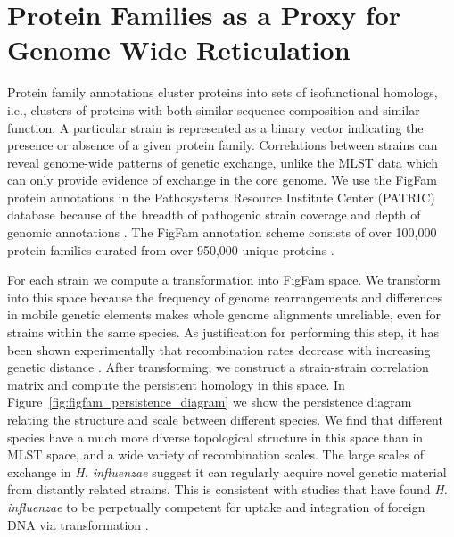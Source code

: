 \section{Protein Families as a Proxy for Genome Wide Reticulation}
\label{pathogens:patric_analysis}

Protein family annotations cluster proteins into sets of isofunctional homologs, i.e., clusters of proteins with both similar sequence composition and similar function.
A particular strain is represented as a binary vector indicating the presence or absence of a given protein family.
Correlations between strains can reveal genome-wide patterns of genetic exchange, unlike the MLST data which can only provide evidence of exchange in the core genome.
We use the FigFam protein annotations in the Pathosystems Resource Institute Center (PATRIC) database because of the breadth of pathogenic strain coverage and depth of genomic annotations \cite{Wattam:2013jy}.
The FigFam annotation scheme consists of over 100,000 protein families curated from over 950,000 unique proteins \cite{Meyer:2009iq}.

For each strain we compute a transformation into FigFam space.
We transform into this space because the frequency of genome rearrangements and differences in mobile genetic elements makes whole genome alignments unreliable, even for strains within the same species.
As justification for performing this step, it has been shown experimentally that recombination rates decrease with increasing genetic distance \cite{Fraser:2007ep}.
After transforming, we construct a strain-strain correlation matrix and compute the persistent homology in this space.
In Figure~\ref{fig:figfam_persistence_diagram} we show the persistence diagram relating the structure and scale between different species.
We find that different species have a much more diverse topological structure in this space than in MLST space, and a wide variety of recombination scales.
The large scales of exchange in \emph{H. influenzae} suggest it can regularly acquire novel genetic material from distantly related strains.
This is consistent with studies that have found \emph{H. influenzae} to be perpetually competent for uptake and integration of foreign DNA via transformation \cite{dubnau1999dna}.

